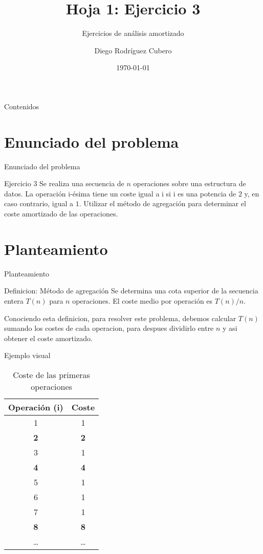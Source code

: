 \documentclass[aspectratio=169]{beamer}
\title{Hoja 1: Ejercicio 3}
\subtitle{Ejercicios de análisis amortizado}
\author{Diego Rodríguez Cubero}
\institute{UCM}
\date{\today}
\begin{document}
\begin{frame}
    \titlepage
\end{frame}

\begin{frame}{Contenidos}
    \tableofcontents
\end{frame}

\section{Enunciado del problema}
\begin{frame}{Enunciado del problema}
    \begin{block}{Ejercicio 3}
        Se realiza una secuencia de $n$ operaciones sobre una estructura de datos. La operación i-ésima tiene un coste igual a i si i es una potencia de $2$ y, en caso contrario, igual a $1$. Utilizar el método de agregación para determinar el coste amortizado de las operaciones.
    \end{block}
\end{frame}

\section{Planteamiento}
\begin{frame}{Planteamiento}
    \begin{exampleblock}{Definicion: Método de agregación}
        Se determina una cota superior de la secuencia entera $T(n)$ para $n$ operaciones. El coste medio por operación es $T(n)/n$.
    \end{exampleblock}
    Conociendo esta definicion, para resolver este problema, debemos calcular $T(n)$ sumando los costes de cada operacion, para despues dividirlo entre $n$ y asi obtener el coste amortizado.
\end{frame}

\begin{frame}{Ejemplo visual}
    \begin{table}
        \centering
        \begin{tabular}{|c|c|}
            \hline
            \textbf{Operación (i)} & \textbf{Coste} \\
            \hline
            1 & 1 \\
            \textbf{2} & \textbf{2} \\
            3 & 1 \\
            \textbf{4} & \textbf{4} \\
            5 & 1 \\
            6 & 1 \\
            7 & 1 \\
            \textbf{8} & \textbf{8} \\
            \ldots & \ldots \\
            \hline
        \end{tabular}
        \caption{Coste de las primeras operaciones}
    \end{table}
\end{frame}
\end{document}
